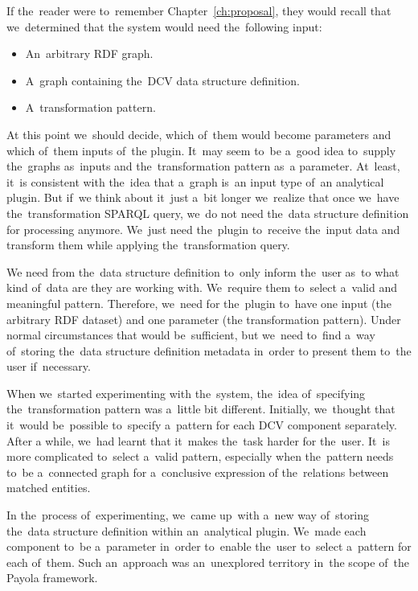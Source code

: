 If the~reader were to~remember Chapter~\ref{ch:proposal}, they would recall that we~determined that 
the system would need the~following input:
\begin{itemize}
  \item An~arbitrary RDF graph.
  \item A~graph containing the~DCV data structure definition.
  \item A~transformation pattern.
\end{itemize}

At this point we~should decide, which of~them would become parameters and which of~them inputs of~the plugin. It~may seem to~be a~good idea to~supply the~graphs as~inputs and the~transformation pattern as~a parameter. At~least, it~is 
consistent with the~idea that a~graph is~an input type of~an analytical plugin. 
But if~we think about it~just a~bit longer we~realize that once we~have the~transformation SPARQL query, we~do not need the~data structure definition for 
processing anymore. We~just need the~plugin to~receive the~input data and transform 
them while applying the~transformation query.

We need from the~data structure definition to~only inform the~user as~to what kind of~data are they 
are working 
with. We~require them to~select a~valid and meaningful pattern. 
Therefore, we~need for the~plugin to~have one input (the arbitrary RDF dataset) and 
one parameter (the transformation pattern). Under normal circumstances
that would be~sufficient, but we~need to~find a~way of~storing the~data structure definition metadata in~order 
to present them to~the user if~necessary.

When we~started experimenting with the~system, the~idea of~specifying the~transformation pattern was a~little bit different. Initially, we~thought that it~would be~possible to~specify a~pattern for each DCV component separately. After 
a while, we~had learnt that it~makes the~task harder for the~user. It~is more complicated to~select a~valid pattern, especially when the~pattern needs to~be a~connected graph for a~conclusive expression
of the~relations between matched entities.

In the~process of~experimenting, we~came up~with a~new way of~storing the~data structure definition within an~analytical plugin. We~made each component to~be a~parameter in~order to~enable the~user to~select a~pattern for each of~them. Such an~approach was an~unexplored territory in~the scope of~the Payola framework.

